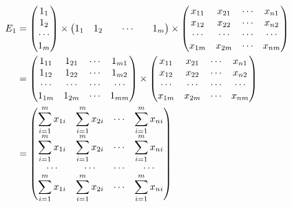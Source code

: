 \documentclass[12pt,a4paper]{article}
\begin{document}
\begin{enumerate}
\begin{enumerate}
\begin{equation}
\begin{split}
\begin{aligned}
\notag
	E_1 &= \begin{pmatrix}1_1\\1_2\\\cdots\\1_m\end{pmatrix} \times \begin{pmatrix} 1_1&1_2&&\cdots&&1_m \end{pmatrix} \times \begin{pmatrix}	
x_{11}&x_{21}&\cdots&x_{n1}\\ 
x_{12}&x_{22}&\cdots&x_{n2}\\ 
\cdots & \cdots & \cdots & \cdots \\
x_{1m}&x_{2m}&\cdots&x_{nm}
\end{pmatrix} \\ & = \begin{pmatrix}	
		1_{11}&1_{21}&\cdots&1_{m1}\\ 
		1_{12}&1_{22}&\cdots&1_{m2}\\ 
		\cdots & \cdots & \cdots & \cdots \\
		1_{1m}&1_{2m}&\cdots&1_{mm}
		\end{pmatrix}\times
		\begin{pmatrix}	
		x_{11}&x_{21}&\cdots&x_{n1}\\ 
		x_{12}&x_{22}&\cdots&x_{n2}\\ 
		\cdots & \cdots & \cdots & \cdots \\
		x_{1m}&x_{2m}&\cdots&x_{nm}
		\end{pmatrix} \\ &  =   \begin{pmatrix}	
		\displaystyle\sum_{i=1}^{m}x_{1 i}&\displaystyle\sum_{i=1}^{m}x_{2 i}&\cdots&\displaystyle\sum_{i=1}^{m}x_{n i}\\ 
		\displaystyle\sum_{i=1}^{m}x_{1 i}&\displaystyle\sum_{i=1}^{m}x_{2 i}&\cdots&\displaystyle\sum_{i=1}^{m}x_{n i}\\ 
		\cdots & \cdots & \cdots & \cdots \\
		\displaystyle\sum_{i=1}^{m}x_{1 i}&\displaystyle\sum_{i=1}^{m}x_{2 i}&\cdots&\displaystyle\sum_{i=1}^{m}x_{n i}
		\end{pmatrix}
\end{aligned}
\end{split}
\end{equation}



\end{enumerate}
\end{enumerate}
\end{document}
